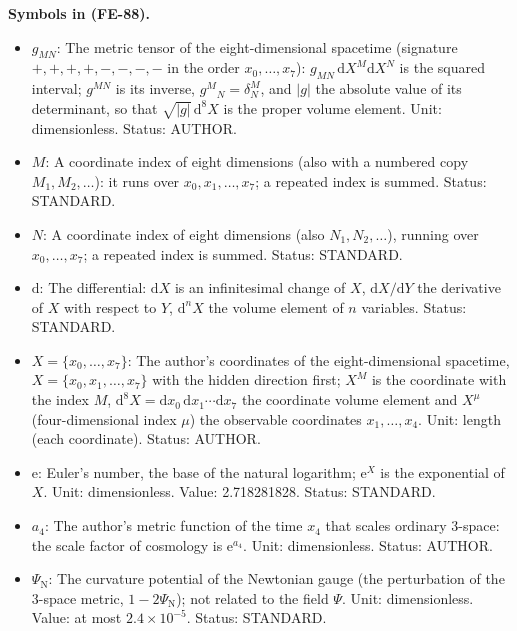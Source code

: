 \documentclass[
  10pt,
]{article}
\providecommand{\tightlist}{%
  \setlength{\itemsep}{0pt}\setlength{\parskip}{0pt}}
\begin{document}
\textbf{Symbols in (FE-88).}

\begin{itemize}
\tightlist
\item
  \(g_{MN}\): The metric tensor of the eight-dimensional spacetime
  (signature \(+,+,+,+,-,-,-,-\) in the order \(x_0, \dots, x_7\)):
  \(g_{MN}\,\mathrm{d}X^M\mathrm{d}X^N\) is the squared interval;
  \(g^{MN}\) is its inverse, \(g^M{}_N = \delta^M_N\), and
  \(\lvert g\rvert\) the absolute value of its determinant, so that
  \(\sqrt{\lvert g\rvert}\,\mathrm{d}^8X\) is the proper volume element.
  Unit: dimensionless. Status: AUTHOR.
\item
  \(M\): A coordinate index of eight dimensions (also with a numbered
  copy \(M_1, M_2, \dots\)): it runs over \(x_0, x_1, \dots, x_7\); a
  repeated index is summed. Status: STANDARD.
\item
  \(N\): A coordinate index of eight dimensions (also
  \(N_1, N_2, \dots\)), running over \(x_0, \dots, x_7\); a repeated
  index is summed. Status: STANDARD.
\item
  \(\mathrm{d}\): The differential: \(\mathrm{d}X\) is an infinitesimal
  change of \(X\), \(\mathrm{d}X/\mathrm{d}Y\) the derivative of \(X\)
  with respect to \(Y\), \(\mathrm{d}^nX\) the volume element of \(n\)
  variables. Status: STANDARD.
\item
  \(X = \{x_0, \dots, x_7\}\): The author's coordinates of the
  eight-dimensional spacetime, \(X = \{x_0, x_1, \dots, x_7\}\) with the
  hidden direction first; \(X^M\) is the coordinate with the index
  \(M\),
  \(\mathrm{d}^8X = \mathrm{d}x_0\,\mathrm{d}x_1\cdots\mathrm{d}x_7\)
  the coordinate volume element and \(X^\mu\) (four-dimensional index
  \(\mu\)) the observable coordinates \(x_1, \dots, x_4\). Unit: length
  (each coordinate). Status: AUTHOR.
\item
  \(\mathrm{e}\): Euler's number, the base of the natural logarithm;
  \(\mathrm{e}^{X}\) is the exponential of \(X\). Unit: dimensionless.
  Value: 2.718281828. Status: STANDARD.
\item
  \(a_4\): The author's metric function of the time \(x_4\) that scales
  ordinary 3-space: the scale factor of cosmology is
  \(\mathrm{e}^{a_4}\). Unit: dimensionless. Status: AUTHOR.
\item
  \(\Psi_{\mathrm{N}}\): The curvature potential of the Newtonian gauge
  (the perturbation of the 3-space metric, \(1 - 2\Psi_{\mathrm{N}}\));
  not related to the field \(\Psi\). Unit: dimensionless. Value: at most
  \(2.4\times10^{-5}\). Status: STANDARD.

\end{itemize}
\end{document}
